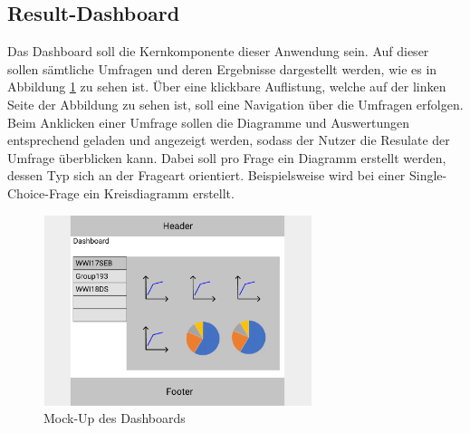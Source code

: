 \subsection{Result-Dashboard}
\label{ssec:konzept:client:dashboard}

Das Dashboard soll die Kernkomponente dieser Anwendung sein. 
Auf dieser sollen sämtliche Umfragen und deren Ergebnisse dargestellt werden, wie es in Abbildung \ref{fig:MockDashboard} zu sehen ist.
Über eine klickbare Auflistung, welche auf der linken Seite der Abbildung zu sehen ist, soll eine Navigation über die Umfragen erfolgen.
Beim Anklicken einer Umfrage sollen die Diagramme und Auswertungen entsprechend geladen und angezeigt werden, sodass der Nutzer die Resulate der Umfrage überblicken kann.
Dabei soll pro Frage ein Diagramm erstellt werden, dessen Typ sich an der Frageart orientiert.
Beispielsweise wird bei einer Single-Choice-Frage ein Kreisdiagramm erstellt.

\begin{figure}[H]
	\centering
	\includegraphics[width=0.7\textwidth]{img/konzeption/client/dashboard}
	\captionsetup{justification=centering, format=plain}
	\caption[Mock-Up des Dashboards]{Mock-Up des Dashboards \\\figma}
	\label{fig:MockDashboard}
\end{figure}

